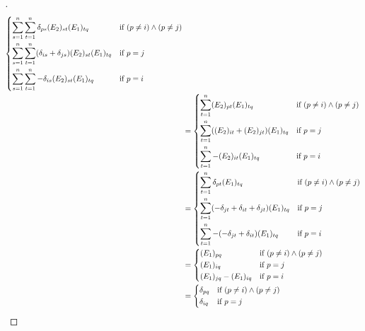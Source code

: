 \begin{proof}[]
\begin{align*}
\begin{dcases}
			     \sum_{s = 1}^n \sum_{t = 1}^n \delta_{p s} (E_2)_{s t} (E_1)_{t q}                  & \text{if } (p \neq i) \land (p \neq j) \\
			     \sum_{s = 1}^n \sum_{t = 1}^n (\delta_{i s} + \delta_{j s}) (E_2)_{s t} (E_1)_{t q} & \text{if } p = j                       \\
			     \sum_{s = 1}^n \sum_{t = 1}^n -\delta_{i s} (E_2)_{s t} (E_1)_{t q}                 & \text{if } p = i
		     \end{dcases}                  \\
		 & = \begin{dcases}
			     \sum_{t = 1}^n (E_2)_{p t} (E_1)_{t q}                 & \text{if } (p \neq i) \land (p \neq j) \\
			     \sum_{t = 1}^n ((E_2)_{i t} + (E_2)_{j t}) (E_1)_{t q} & \text{if } p = j                       \\
			     \sum_{t = 1}^n -(E_2)_{i t} (E_1)_{t q}                & \text{if } p = i
		     \end{dcases}                                               \\
		 & = \begin{dcases}
			     \sum_{t = 1}^n \delta_{p t} (E_1)_{t q}                                  & \text{if } (p \neq i) \land (p \neq j) \\
			     \sum_{t = 1}^n (-\delta_{j t} + \delta_{i t} + \delta_{j t}) (E_1)_{t q} & \text{if } p = j                       \\
			     \sum_{t = 1}^n -(-\delta_{j t} + \delta_{i t}) (E_1)_{t q}               & \text{if } p = i
		     \end{dcases}                             \\
		 & = \begin{dcases}
			     (E_1)_{p q}               & \text{if } (p \neq i) \land (p \neq j) \\
			     (E_1)_{i q}               & \text{if } p = j                       \\
			     (E_1)_{j q} - (E_1)_{i q} & \text{if } p = i
		     \end{dcases}                                                                            \\
		 & = \begin{dcases}
			     \delta_{p q}                               & \text{if } (p \neq i) \land (p \neq j) \\
			     \delta_{i q}                               & \text{if } p = j                       \\

\end{dcases}
\end{align*}
\end{proof}
